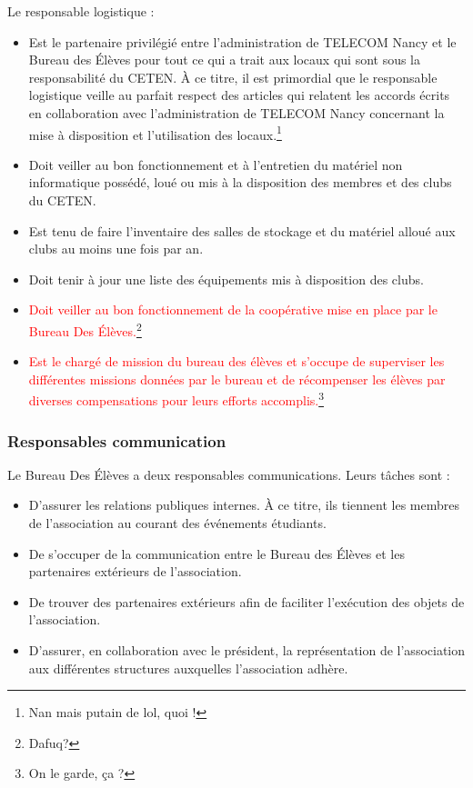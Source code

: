 \documentclass{article} %
\begin{document}
				Le responsable logistique :
				\begin{itemize}
					\item Est le partenaire privilégié entre l’administration de
						TELECOM Nancy et le Bureau des Élèves pour tout ce qui a
						trait aux locaux qui sont sous la responsabilité du
						CETEN. À ce titre, il est primordial que le responsable
						logistique veille au parfait respect des articles qui
						relatent les accords écrits en collaboration avec
						l’administration de TELECOM Nancy concernant la mise à
						disposition et l’utilisation des locaux.\footnote{Nan
						mais putain de lol, quoi !}
					\item Doit veiller au bon fonctionnement et à l’entretien du
						matériel non informatique possédé, loué ou mis à la
						disposition des membres et des clubs du CETEN.
					\item Est tenu de faire l’inventaire des salles de stockage
						et du matériel alloué aux clubs au moins une fois par
						an.
					\item Doit tenir à jour une liste des équipements mis à
						disposition des clubs.
					\item \textcolor{red}{Doit veiller au bon fonctionnement de
						la coopérative mise en place par le Bureau Des
						Élèves.}\footnote{Dafuq?}
					\item \textcolor{red}{Est le chargé de mission du bureau
						des élèves et s’occupe de superviser les différentes
						missions données par le bureau et de récompenser les
						élèves par diverses compensations pour leurs efforts
						accomplis.}\footnote{On le garde, ça ?}
				\end{itemize}

			\subsubsection{Responsables communication}

				Le Bureau Des Élèves a deux responsables communications. Leurs
				tâches sont :
				\begin{itemize}
					\item D’assurer les relations publiques internes. À ce
						titre, ils tiennent les membres de l’association au
						courant des événements étudiants.
					\item De s’occuper de la communication entre le Bureau des
						Élèves et les partenaires extérieurs de l’association.
					\item De trouver des partenaires extérieurs afin de
						faciliter l’exécution des objets de l’association.
					\item D’assurer, en collaboration avec le président, la
						représentation de l’association aux différentes
						structures auxquelles l’association adhère. 
				\end{itemize}
\end{document}

